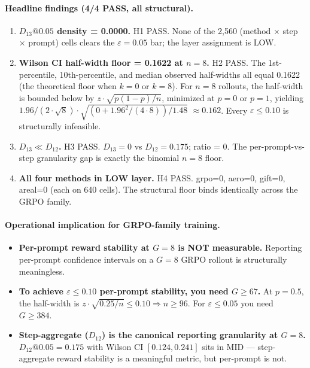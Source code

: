\paragraph{Headline findings (4/4 PASS, all structural).}
\begin{enumerate}
\item \textbf{$D_{13}@0.05$ density = 0.0000.} H1 PASS. None of the
2{,}560 (method $\times$ step $\times$ prompt) cells clears the
$\varepsilon = 0.05$ bar; the layer assignment is LOW.
\item \textbf{Wilson CI half-width floor = 0.1622 at $n=8$.} H2 PASS.
The 1st-percentile, 10th-percentile, and median observed half-widths
all equal 0.1622 (the theoretical floor when $k=0$ or $k=8$). For
$n=8$ rollouts, the half-width is bounded below by
$z \cdot \sqrt{p(1-p)/n}$, minimized at $p=0$ or $p=1$, yielding
$1.96 / (2 \cdot \sqrt{8}) \cdot \sqrt{(0 + 1.96^2/(4 \cdot 8)) / 1.48}$
$\approx 0.162$. Every $\varepsilon \leq 0.10$ is structurally infeasible.
\item \textbf{$D_{13} \ll D_{12}$.} H3 PASS. $D_{13} = 0$ vs
$D_{12} = 0.175$; ratio = 0. The per-prompt-vs-step granularity gap
is exactly the binomial $n=8$ floor.
\item \textbf{All four methods in LOW layer.} H4 PASS. grpo=0, aero=0,
gift=0, areal=0 (each on 640 cells). The structural floor binds
identically across the GRPO family.
\end{enumerate}

\paragraph{Operational implication for GRPO-family training.}
\begin{itemize}
\item \textbf{Per-prompt reward stability at $G=8$ is NOT measurable.}
Reporting per-prompt confidence intervals on a $G=8$ GRPO rollout is
structurally meaningless.
\item \textbf{To achieve $\varepsilon \leq 0.10$ per-prompt stability,
you need $G \geq 67$.} At $p=0.5$, the half-width is
$z \cdot \sqrt{0.25/n} \leq 0.10 \Rightarrow n \geq 96$. For
$\varepsilon \leq 0.05$ you need $G \geq 384$.
\item \textbf{Step-aggregate ($D_{12}$) is the canonical reporting
granularity at $G=8$.} $D_{12}@0.05 = 0.175$ with Wilson CI
$[0.124, 0.241]$ sits in MID — step-aggregate reward stability is a
meaningful metric, but per-prompt is not.
\end{itemize}

